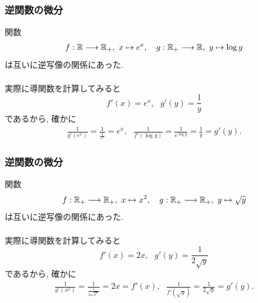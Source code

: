 

\begin{frame}
\frametitle{逆関数の微分}


関数
\begin{align*}
f: \R \longrightarrow \R_+, \  x \mapsto e^x, \ \ \ 
g: \R_+ \longrightarrow \R, \ y \mapsto \log y
\end{align*}
は互いに逆写像の関係にあった. \\
\ \\

実際に導関数を計算してみると
$$
f'(x)=e^x, \ \ \ g'(y)= \frac{1}{y}
$$
であるから, 確かに
\begin{align*}
\frac{1}{g'(e^x)} = \frac{1}{\frac{1}{e^x}}=e^x, \ \ \ \frac{1}{f'(\log y)}=\frac{1}{e^{\log y}}=\frac{1}{y}=g'(y). 
\end{align*}



\end{frame}





\begin{frame}
\frametitle{逆関数の微分}


関数
\begin{align*}
f: \mathbb{R}_+ \longrightarrow \mathbb{R}_+,  \  x \mapsto x^2, \ \ \ g: \mathbb{R}_+ \longrightarrow \mathbb{R}_+,  \ y \mapsto \sqrt{y}
\end{align*}
は互いに逆写像の関係にあった. \\
\ \\

実際に導関数を計算してみると
$$
f'(x)=2x, \ \ \ g'(y)= \frac{1}{2\sqrt{y}}
$$
であるから, 確かに
\begin{align*}
 \frac{1}{g'(x^2)} = \frac{1}{\frac{1}{2\sqrt{x^2}}}=2x =f'(x), \ \ \ \frac{1}{f'(\sqrt{y})}=\frac{1}{2\sqrt{y}}=g'(y). 
\end{align*}



\end{frame}





